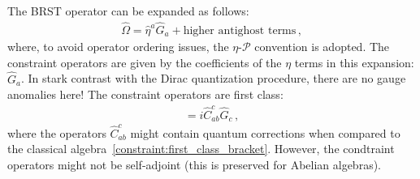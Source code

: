     \begin{construct}
        The BRST operator can be expanded as follows:
        \begin{gather}
            \widehat{\Omega} = \widehat{\eta}^a\widehat{G}_a + \text{higher antighost terms}\,,
        \end{gather}
        where, to avoid operator ordering issues, the $\eta$-$\mathcal{P}$ convention is adopted. The constraint operators are given by the coefficients of the $\eta$ terms in this expansion: $\widehat{G}_a$. In stark contrast with the Dirac quantization procedure, there are no gauge anomalies here! The constraint operators are first class:
        \begin{gather}
            [\widehat{G}_a,\widehat{G}_b]=i\widehat{C}^c_{ab}\widehat{G}_c\,,
        \end{gather}
        where the operators $\widehat{C}^c_{ab}$ might contain quantum corrections when compared to the classical algebra~\cref{constraint:first_class_bracket}. However, the condtraint operators might not be self-adjoint (this is preserved for Abelian algebras).
    \end{construct}